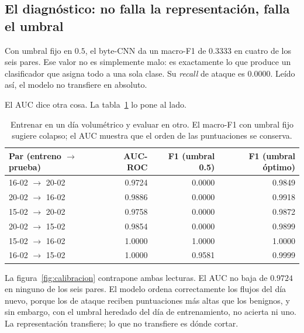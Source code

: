 \subsection*{El diagnóstico: no falla la representación, falla el umbral}

Con umbral fijo en $0.5$, el byte-CNN da un macro-F1 de $0.3333$ en cuatro
de los seis pares. Ese valor no es simplemente malo: es exactamente lo que
produce un clasificador que asigna todo a una sola clase. Su \emph{recall} de
ataque es $0.0000$. Leído así, el modelo no transfiere en absoluto.

El AUC dice otra cosa. La tabla~\ref{tab:calibracion} lo pone al lado.

\begin{table}[htbp]
  \centering
  \caption[Transferencia entre días: umbral fijo frente a AUC]{Entrenar en un
  día volumétrico y evaluar en otro. El macro-F1 con umbral fijo sugiere
  colapso; el AUC muestra que el orden de las puntuaciones se conserva.}
  \label{tab:calibracion}
  \begin{tabular}{lrrr}
    \toprule
    \textbf{Par (entreno $\rightarrow$ prueba)} & \textbf{AUC-ROC} & \textbf{F1 (umbral 0.5)} & \textbf{F1 (umbral óptimo)} \\
    \midrule
    16-02 $\rightarrow$ 20-02 & 0.9724 & 0.0000 & 0.9849 \\
    20-02 $\rightarrow$ 16-02 & 0.9886 & 0.0000 & 0.9918 \\
    15-02 $\rightarrow$ 20-02 & 0.9758 & 0.0000 & 0.9872 \\
    20-02 $\rightarrow$ 15-02 & 0.9854 & 0.0000 & 0.9899 \\
    15-02 $\rightarrow$ 16-02 & 1.0000 & 1.0000 & 1.0000 \\
    16-02 $\rightarrow$ 15-02 & 1.0000 & 0.9581 & 0.9999 \\
    \bottomrule
  \end{tabular}
\end{table}

La figura~\ref{fig:calibracion} contrapone ambas lecturas. El AUC no baja de
$0.9724$ en ninguno de los seis pares. El modelo ordena correctamente los
flujos del día nuevo, porque los de ataque reciben puntuaciones más altas que
los benignos, y sin embargo, con el umbral heredado del día de entrenamiento, no
acierta ni uno. La representación transfiere; lo que no transfiere es dónde
cortar.


